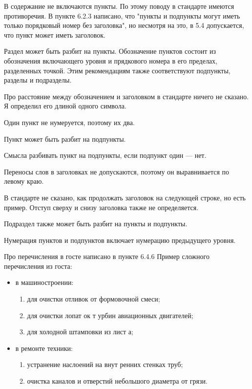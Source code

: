 
В содержание не включаются пункты. По этому поводу в стандарте имеются
противоречия. В пункте 6.2.3 написано, что "пункты и подпункты могут иметь
только порядковый номер без заголовка", но несмотря на это, в 5.4 допускается,
что пункт может иметь заголовок.


\parag

Раздел может быть разбит на пункты. Обозначение пунктов состоит из обозначения
включающего уровня и прядкового номера в его пределах, разделенных точкой. Этим
рекомендациям также соответствуют подпункты, разделы и подразделы.

Про расстояние между обозначением и заголовком в стандарте ничего не
сказано. Я определил его длиной одного символа.

\parag

Один пункт не нумеруется, поэтому их два.

\subparag

Пункт может быть разбит на подпункты.

\subparag

Смысла разбивать пункт на подпункты, если подпункт один --- нет.


Переносы слов в заголовках не допускаются, поэтому он выравнивается по левому
краю.

В стандарте не сказано, как продолжать заголовок на следующей строке, но есть
пример. Отступ сверху и снизу заголовка также не определяется.


\parag

Подраздел также может быть разбит на пункты и подпункты.

\parag

Нумерация пунктов и подпунктов включает нумерацию предыдущего уровня.

Про перечисления в госте написано  в пункте 6.4.6 
Пример сложного перечисления из госта:

\begin{itemize}
    \item в машиностроении:
    \begin{enumerate}
        \item для очистки отливок от формовочной смеси;
        \item для очистки лопат ок т урбин авиационных двигателей;
        \item для холодной штамповки из лист а;
    \end{enumerate}
    \item в ремонте техники:
    \begin{enumerate}
        \item устранение наслоений на внут ренних стенках труб;
        \item очистка каналов и отверстий небольшого диаметра от грязи.
    \end{enumerate}
\end{itemize} 

